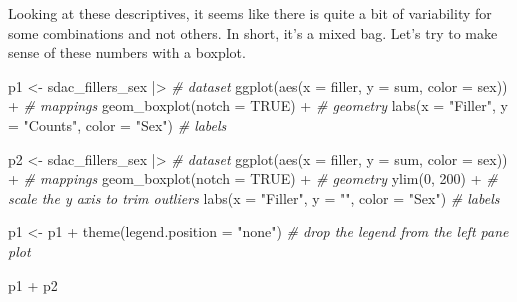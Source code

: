 \documentclass[
  letterpaper,
]{latex/krantz}
\newenvironment{Shaded}{\begin{snugshade}}{\end{snugshade}}
\newcommand{\AttributeTok}[1]{\textcolor[rgb]{0.00,0.00,0.00}{#1}}
\newcommand{\CommentTok}[1]{\textcolor[rgb]{0.00,0.00,0.00}{\textit{#1}}}
\newcommand{\ConstantTok}[1]{\textcolor[rgb]{0.00,0.00,0.00}{#1}}
\newcommand{\DecValTok}[1]{\textcolor[rgb]{0.00,0.00,0.00}{#1}}
\newcommand{\FunctionTok}[1]{\textcolor[rgb]{0.00,0.00,0.00}{#1}}
\newcommand{\NormalTok}[1]{\textcolor[rgb]{0.00,0.00,0.00}{#1}}
\newcommand{\OtherTok}[1]{\textcolor[rgb]{0.00,0.00,0.00}{#1}}
\newcommand{\SpecialCharTok}[1]{\textcolor[rgb]{0.00,0.00,0.00}{#1}}
\newcommand{\StringTok}[1]{\textcolor[rgb]{0.00,0.00,0.00}{#1}}
\begin{document}
Looking at these descriptives, it seems like there is quite a bit of
variability for some combinations and not others. In short, it's a mixed
bag. Let's try to make sense of these numbers with a boxplot.

\begin{Shaded}
\begin{Highlighting}[]
\NormalTok{p1 }\OtherTok{\textless{}{-}} 
\NormalTok{  sdac\_fillers\_sex }\SpecialCharTok{|\textgreater{}} \CommentTok{\# dataset}
  \FunctionTok{ggplot}\NormalTok{(}\FunctionTok{aes}\NormalTok{(}\AttributeTok{x =}\NormalTok{ filler, }\AttributeTok{y =}\NormalTok{ sum, }\AttributeTok{color =}\NormalTok{ sex)) }\SpecialCharTok{+} \CommentTok{\# mappings}
  \FunctionTok{geom\_boxplot}\NormalTok{(}\AttributeTok{notch =} \ConstantTok{TRUE}\NormalTok{) }\SpecialCharTok{+} \CommentTok{\# geometry}
  \FunctionTok{labs}\NormalTok{(}\AttributeTok{x =} \StringTok{"Filler"}\NormalTok{, }\AttributeTok{y =} \StringTok{"Counts"}\NormalTok{, }\AttributeTok{color =} \StringTok{"Sex"}\NormalTok{) }\CommentTok{\# labels}

\NormalTok{p2 }\OtherTok{\textless{}{-}} 
\NormalTok{  sdac\_fillers\_sex }\SpecialCharTok{|\textgreater{}} \CommentTok{\# dataset}
  \FunctionTok{ggplot}\NormalTok{(}\FunctionTok{aes}\NormalTok{(}\AttributeTok{x =}\NormalTok{ filler, }\AttributeTok{y =}\NormalTok{ sum, }\AttributeTok{color =}\NormalTok{ sex)) }\SpecialCharTok{+} \CommentTok{\# mappings}
  \FunctionTok{geom\_boxplot}\NormalTok{(}\AttributeTok{notch =} \ConstantTok{TRUE}\NormalTok{) }\SpecialCharTok{+} \CommentTok{\# geometry}
  \FunctionTok{ylim}\NormalTok{(}\DecValTok{0}\NormalTok{, }\DecValTok{200}\NormalTok{) }\SpecialCharTok{+} \CommentTok{\# scale the y axis to trim outliers}
  \FunctionTok{labs}\NormalTok{(}\AttributeTok{x =} \StringTok{"Filler"}\NormalTok{, }\AttributeTok{y =} \StringTok{""}\NormalTok{, }\AttributeTok{color =} \StringTok{"Sex"}\NormalTok{) }\CommentTok{\# labels}

\NormalTok{p1 }\OtherTok{\textless{}{-}}\NormalTok{ p1 }\SpecialCharTok{+} \FunctionTok{theme}\NormalTok{(}\AttributeTok{legend.position =} \StringTok{"none"}\NormalTok{) }\CommentTok{\# drop the legend from the left pane plot}

\NormalTok{p1 }\SpecialCharTok{+}\NormalTok{ p2}
\end{Highlighting}
\end{Shaded}
\end{document}
